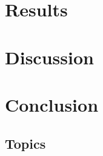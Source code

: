 \documentclass[11pt,titlepage]{report}
\begin{document}
\chapter{Results}


\chapter{Discussion}


\chapter{Conclusion}


\clearpage
\pagestyle{numberonly}
\printbibliography

\begin{appendices}
\chapter{Topics}
\label{app:topics}


\end{appendices}
\end{document}
